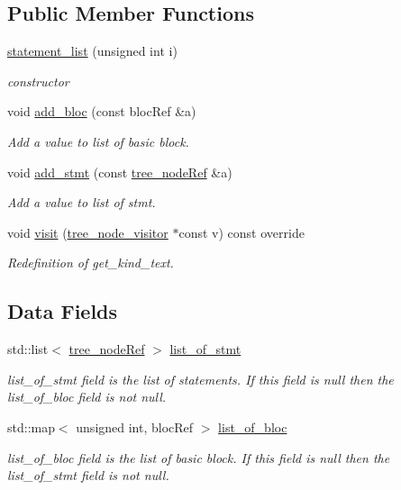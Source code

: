 \subsection*{Public Member Functions}
\begin{DoxyCompactItemize}
\item 
\hyperlink{structstatement__list_ad90399d2c2bd1d1faa1da22ab5352dce}{statement\+\_\+list} (unsigned int i)
\begin{DoxyCompactList}\small\item\em constructor \end{DoxyCompactList}\item 
void \hyperlink{structstatement__list_a3de214bdf9d29f89ae021af745ad2d72}{add\+\_\+bloc} (const bloc\+Ref \&a)
\begin{DoxyCompactList}\small\item\em Add a value to list of basic block. \end{DoxyCompactList}\item 
void \hyperlink{structstatement__list_ae23099368e8af98c8f2cbd3a458fcd44}{add\+\_\+stmt} (const \hyperlink{tree__node_8hpp_a6ee377554d1c4871ad66a337eaa67fd5}{tree\+\_\+node\+Ref} \&a)
\begin{DoxyCompactList}\small\item\em Add a value to list of stmt. \end{DoxyCompactList}\item 
void \hyperlink{structstatement__list_a41991720aa29db82e76b6f28cd03fff3}{visit} (\hyperlink{classtree__node__visitor}{tree\+\_\+node\+\_\+visitor} $\ast$const v) const override
\begin{DoxyCompactList}\small\item\em Redefinition of get\+\_\+kind\+\_\+text. \end{DoxyCompactList}\end{DoxyCompactItemize}
\subsection*{Data Fields}
\begin{DoxyCompactItemize}
\item 
std\+::list$<$ \hyperlink{tree__node_8hpp_a6ee377554d1c4871ad66a337eaa67fd5}{tree\+\_\+node\+Ref} $>$ \hyperlink{structstatement__list_a28140056133e331a78154933e1f2bee5}{list\+\_\+of\+\_\+stmt}
\begin{DoxyCompactList}\small\item\em list\+\_\+of\+\_\+stmt field is the list of statements. If this field is null then the list\+\_\+of\+\_\+bloc field is not null. \end{DoxyCompactList}\item 
std\+::map$<$ unsigned int, bloc\+Ref $>$ \hyperlink{structstatement__list_af54c307c1d5ccb43616915b912a916f0}{list\+\_\+of\+\_\+bloc}
\begin{DoxyCompactList}\small\item\em list\+\_\+of\+\_\+bloc field is the list of basic block. If this field is null then the list\+\_\+of\+\_\+stmt field is not null. \end{DoxyCompactList}\end{DoxyCompactItemize}
